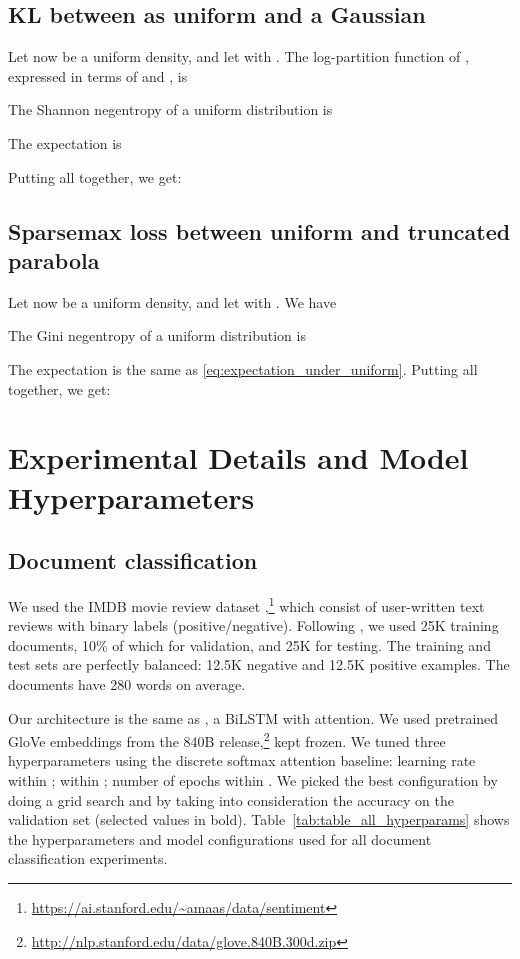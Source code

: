 \documentclass{article}
\begin{document}
{\subsection{KL  between as uniform and a Gaussian}

Let now  be a uniform density, and let  with .
The log-partition function of , expressed in terms of  and , is

The Shannon negentropy of a uniform distribution is

The expectation  is

Putting all together, we get:



\subsection{Sparsemax loss between uniform and truncated parabola}

Let now  be a uniform density, and let  with .
We have

The Gini negentropy of a uniform distribution is

The expectation  is the same as \eqref{eq:expectation_under_uniform}.
Putting all together, we get:

}



\section{Experimental Details and Model Hyperparameters}\label{sec:model_hyperparams}

\subsection{Document classification}

We used the IMDB movie review dataset \citep{maas2011learning},\footnote{\url{https://ai.stanford.edu/~amaas/data/sentiment}} which consist of user-written text reviews with binary labels (positive/negative). 
Following \citep{jain2019attention}, we used 25K training documents, 10\% of which for validation, and 25K for testing. The training and test sets are perfectly balanced: 12.5K negative and 12.5K positive examples. 
The documents have 280 words on average.  

Our architecture is the same as \citep{maas2011learning}, a BiLSTM with attention. 
We used pretrained GloVe embeddings from the 840B release,\footnote{\url{http://nlp.stanford.edu/data/glove.840B.300d.zip}} kept frozen. 
We tuned three hyperparameters using the discrete softmax attention baseline:
learning rate within ;  within ; number of epochs within . 
We picked the best configuration by doing a grid search and by taking into consideration the accuracy on the validation set (selected values in bold).
Table~\ref{tab:table_all_hyperparams} shows the hyperparameters and model configurations used for all document classification experiments.
\end{document}

